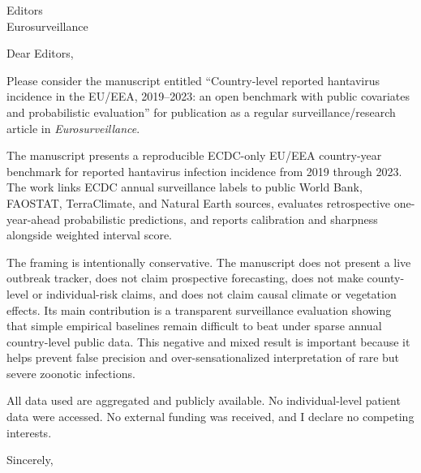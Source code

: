 \documentclass[11pt]{letter}
\begin{document}
\begin{letter}{Editors\\Eurosurveillance}

\sloppy
\opening{Dear Editors,}

Please consider the manuscript entitled ``Country-level reported hantavirus incidence in the EU/EEA, 2019--2023: an open benchmark with public covariates and probabilistic evaluation'' for publication as a regular surveillance/research article in \emph{Eurosurveillance}.

The manuscript presents a reproducible ECDC-only EU/EEA country-year benchmark for reported hantavirus infection incidence from 2019 through 2023. The work links ECDC annual surveillance labels to public World Bank, FAOSTAT, TerraClimate, and Natural Earth sources, evaluates retrospective one-year-ahead probabilistic predictions, and reports calibration and sharpness alongside weighted interval score.

The framing is intentionally conservative. The manuscript does not present a live outbreak tracker, does not claim prospective forecasting, does not make county-level or individual-risk claims, and does not claim causal climate or vegetation effects. Its main contribution is a transparent surveillance evaluation showing that simple empirical baselines remain difficult to beat under sparse annual country-level public data. This negative and mixed result is important because it helps prevent false precision and over-sensationalized interpretation of rare but severe zoonotic infections.

All data used are aggregated and publicly available. No individual-level patient data were accessed. No external funding was received, and I declare no competing interests.

\closing{Sincerely,}

\end{letter}
\end{document}
